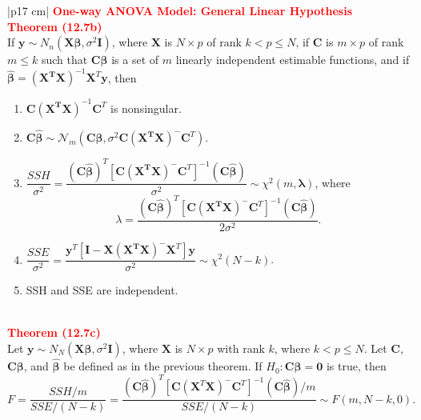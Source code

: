 \documentclass[a4paper,11pt]{article}
\begin{document}
\begin{longtable}{|p{17 cm}|}
\hline
\textbf{\textcolor{red}{One-way ANOVA Model: General Linear Hypothesis}} \\
\textbf{\textcolor{red}{Theorem (12.7b)}}\\
If $\mathbf{y} \sim N_n(\mathbf{X}\boldsymbol{\beta}, \sigma^2\mathbf{I})$, where $\mathbf{X}$ is $N \times p$ of rank $k < p \leq N$, if $\mathbf{C}$ is $m \times p$ of rank $m \leq k$ such that $\mathbf{C}\boldsymbol{\beta}$ is a set of $m$ linearly independent estimable functions, and if
$\boldsymbol{\hat{\beta}} = (\mathbf{X^TX})^{-1}\mathbf{X}^T\mathbf{y}$, then
\begin{minipage}{\linewidth} 
\begin{enumerate}
    \item $\mathbf{C(X^T X)}^{-1}\mathbf{C}^T$ is nonsingular.
    \item $\mathbf{C}\boldsymbol{\hat{\beta}} \sim \mathcal{N}_m(\mathbf{C}\boldsymbol{\beta} , \sigma^2\mathbf{C}(\mathbf{X^T X})^{-}\mathbf{C}^T)$.
    \item $\dfrac{SSH}{\sigma^2}=\dfrac{(\mathbf{C} \boldsymbol{\hat{\beta}})^T [\mathbf{C} (\mathbf{X^T X})^{-} \mathbf{C}^T]^{-1} (\mathbf{C} \boldsymbol{\hat{\beta}})}{\sigma^2} \sim \chi^2(m,\boldsymbol{\lambda})$, where 
    \[
    \lambda = \dfrac{(\mathbf{C} \boldsymbol{\hat{\beta}})^T [\mathbf{C} (\mathbf{X^T X})^{-} \mathbf{C}^T]^{-1} (\mathbf{C} \boldsymbol{\hat{\beta}})}{2\sigma^2}.
    \]
    \item $\dfrac{{SSE}}{\sigma^2}=\dfrac{\boldsymbol{y}^T[\mathbf{I} - \mathbf{X}(\mathbf{X^T X})^{-} \mathbf{X}^T] \boldsymbol{y}}{\sigma^2} \sim \chi^2(N - k)$.
    \item SSH and SSE are independent.
\end{enumerate}
\end{minipage} \\
\hline
\textbf{\textcolor{red}{Theorem (12.7c)}}\\
Let \( \boldsymbol{y} \sim N_N(\mathbf{X} \boldsymbol{\beta}, \sigma^2 \mathbf{I}) \), where \( \mathbf{X} \) is \( N \times p \) with rank \( k \), where \( k < p \leq N \). Let \( \mathbf{C} \), \( \mathbf{C} \boldsymbol{\beta} \), and \( \boldsymbol{\hat{\beta}} \) be defined as in the previous theorem. If \( H_0 : \mathbf{C} \boldsymbol{\beta} = \boldsymbol{0} \) is true, then
\[
F = \frac{SSH/m}{SSE/(N-k)} = \frac{(\mathbf{C} \boldsymbol{\hat{\beta}})^T [\mathbf{C} (\mathbf{X}^T \mathbf{X})^{-} \mathbf{C}^T]^{-1} (\mathbf{C} \boldsymbol{\hat{\beta}})/m}{SSE/(N-k)} \sim F(m, N - k, 0).
\]\\

\end{longtable}
\end{document}
